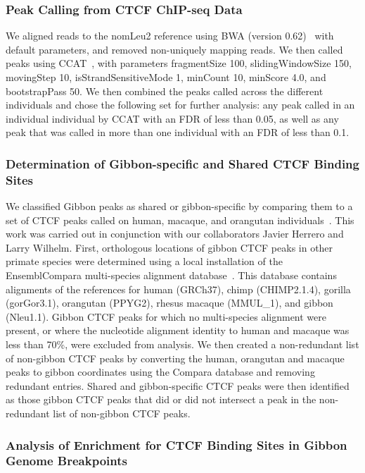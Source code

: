 \subsubsection{Peak Calling from CTCF ChIP-seq Data}

We aligned reads to the nomLeu2 reference using BWA (version 0.62)~\cite{Li:2009p836} with default parameters, and removed non-uniquely mapping reads. We then called peaks using CCAT~\cite{Xu:2010fu}, with parameters fragmentSize 100, slidingWindowSize 150, movingStep 10, isStrandSensitiveMode 1, minCount 10, minScore 4.0, and bootstrapPass 50. We then combined the peaks called across the different individuals and chose the following set for further analysis: any peak called in an individual individual by CCAT with an FDR of less than 0.05, as well as any peak that was called in more than one individual with an FDR of less than 0.1. 

\subsubsection{Determination of Gibbon-specific and Shared CTCF Binding Sites}

We classified Gibbon peaks as shared or gibbon-specific by comparing them to a set of CTCF peaks called on human, macaque, and orangutan individuals~\cite{Schwalie:2014}. This work was carried out in conjunction with our collaborators Javier Herrero and Larry Wilhelm. First, orthologous locations of gibbon CTCF peaks in other primate species were determined using a local installation of the EnsemblCompara multi-species alignment database~\cite{ensembl_compara,Vilella:2009ju}. This database contains alignments of the references for human (GRCh37), chimp (CHIMP2.1.4), gorilla (gorGor3.1), orangutan (PPYG2), rhesus macaque (MMUL\_1), and gibbon (Nleu1.1). Gibbon CTCF peaks for which no multi-species alignment were present, or where the nucleotide alignment identity to human and macaque was less than 70\%, were excluded from analysis. We then created a non-redundant list of non-gibbon CTCF peaks by converting the human, orangutan and macaque peaks to gibbon coordinates using the Compara database and removing redundant entries. Shared and gibbon-specific CTCF peaks were then identified as those gibbon CTCF peaks that did or did not intersect a peak in the non-redundant list of non-gibbon CTCF peaks.

\subsubsection{Analysis of Enrichment for CTCF Binding Sites in Gibbon Genome Breakpoints}

